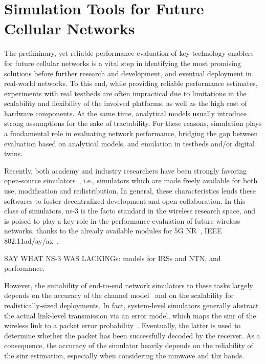 \chapter{Simulation Tools for Future Cellular Networks}
\label{ch:sim-tools}

The preliminary, yet reliable performance evaluation of key technology enablers for future cellular networks is a vital step in identifying the most promising solutions before further research and development, and eventual deployment in real-world networks.
To this end, while providing reliable performance estimates, experiments with real testbeds are often impractical due to limitations in the scalability and flexibility of the involved platforms, as well as the high cost of hardware components. At the same time, analytical models usually introduce strong assumptions for the sake of tractability.
For these reasons, simulation plays a fundamental role in evaluating network performance, bridging the gap between evaluation based on analytical models, and emulation in testbeds and/or digital twins.

Recently, both academy and industry researchers have been strongly favoring open-source simulators~\cite{hoydis2022sionna}, i.e., simulators which are made freely available for both use, modification and redistribution. In general, these characteristics lends these softwares to foster decentralized development and open collaboration.
In this class of simulators, ns-3 is the facto standard in the wireless research space, and is poised to play a key role in the performance evaluation of future wireless networks, thanks to the already available modules for 5G NR~\cite{mezzavilla2018end, patriciello2019e2e}, IEEE 802.11ad/ay/ax~\cite{magrinValid2021, 10.1145/3460797.3460799, 7461452}.

SAY WHAT NS-3 WAS LACKINGs: models for IRSs and NTN, and performance.

However, the suitability of end-to-end network simulators to these tasks largely depends on the accuracy of the channel model~\cite{testolina2020scalable} and on the scalability for realistically-sized deployments.
In fact, system-level simulators generally abstract the actual link-level transmission via an error model, which maps the \gls{sinr} of the wireless link to a packet error probability~\cite{lagen2020new}. Eventually, the latter is used to determine whether the packet has been successfully decoded by the receiver. As a consequence, the accuracy of the simulator heavily depends on the reliability of the \gls{sinr} estimation, especially when considering the \gls{mmwave} and \gls{thz} bands. 

